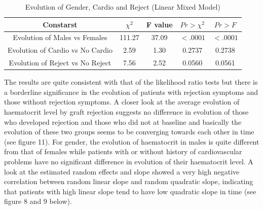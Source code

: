 \documentclass[11pt]{article}
\begin{document}
\begin{table}[H]
\centering
\begin{tabular}{ccccc}
\hline
Constarst & $\chi^2$ & F value & $Pr > \chi^2$ & $Pr > F$ \\
\hline
Evolution of Males vs Females & 111.27 & 37.09 & $<.0001$ &  $ <.0001$ \\
Evolution of Cardio vs No Cardio & 2.59 & 1.30& 0.2737 & 0.2738 \\
Evolution of Reject vs No Reject & 7.56 & 2.52& 0.0560 & 0.0561  \\
\hline
\end{tabular}
\caption{Evolution of Gender, Cardio and Reject (Linear Mixed Model)}
\end{table}

The results are quite consistent with that of the likelihood ratio tests but there is a borderline significance in the evolution of patients with rejection symptoms and those without rejection symptoms. A closer look at the average evolution of haematocrit level by graft rejection suggests no difference in evolution of those who developed rejection and those who did not at baseline and basically the evolution of these two groups seems to be converging towards each other in time (see figure 11). For gender, the evolution of haematocrit in males is quite different from that of females while patients with or without history of cardiovascular problems have no significant difference in evolution of their haematocrit level. A look at the estimated random effects and slope showed a very high negative correlation between random linear slope and random quadratic slope, indicating that patients with high linear slope tend to have low quadratic slope in time (see figure 8 and 9 below).\\
\end{document}
